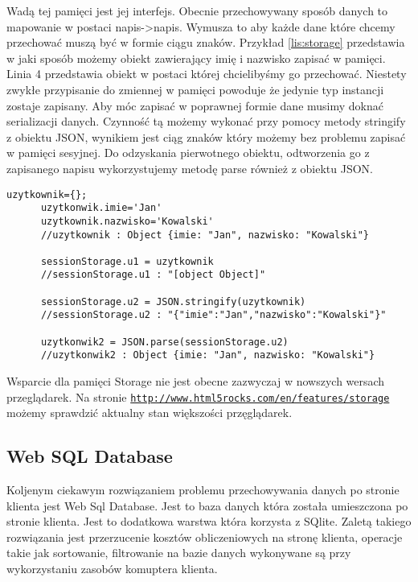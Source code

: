 Wadą tej pamięci jest jej interfejs. Obecnie przechowywany sposób danych to mapowanie w postaci napis->napis. Wymusza to aby każde dane które chcemy przechować muszą być w formie ciągu znaków. Przykład \ref{lis:storage} przedstawia w jaki sposób możemy obiekt zawierający imię i nazwisko zapisać w pamięci. Linia 4 przedstawia obiekt w postaci której chcielibyśmy go przechować. Niestety zwykłe przypisanie do zmiennej w pamięci powoduje że jedynie typ instancji zostaje zapisany. Aby móc zapisać w poprawnej formie dane musimy doknać serializacji danych. Czynność tą możemy wykonać przy pomocy metody stringify z obiektu JSON, wynikiem jest ciąg znaków który możemy bez problemu zapisać w pamięci sesyjnej. Do odzyskania pierwotnego obiektu, odtworzenia go z zapisanego napisu wykorzystujemy metodę parse również z obiektu JSON.

\lstset{language=JavaScript}
\label{lis:storage}
\begin{lstlisting}[caption=json]
      uzytkownik={};
      uzytkonwik.imie='Jan'
      uzytkownik.nazwisko='Kowalski'
      //uzytkownik : Object {imie: "Jan", nazwisko: "Kowalski"}

      sessionStorage.u1 = uzytkownik
      //sessionStorage.u1 : "[object Object]"

      sessionStorage.u2 = JSON.stringify(uzytkownik)
      //sessionStorage.u2 : "{"imie":"Jan","nazwisko":"Kowalski"}"

      uzytkonwik2 = JSON.parse(sessionStorage.u2)
      //uzytkonwik2 : Object {imie: "Jan", nazwisko: "Kowalski"}
\end{lstlisting}



Wsparcie dla pamięci Storage nie jest obecne zazwyczaj w nowszych wersach przeglądarek. Na stronie \underline{\texttt{http://www.html5rocks.com/en/features/storage}} możemy sprawdzić aktualny stan większości przęglądarek.

\subsection{Web SQL Database}
\label{subsec:websql}

Koljenym ciekawym rozwiązaniem problemu przechowywania danych po stronie klienta jest Web Sql Database.
Jest to baza danych która została umieszczona po stronie klienta. Jest to dodatkowa warstwa która korzysta z SQlite.
Zaletą takiego rozwiązania jest przerzucenie kosztów obliczeniowych na stronę klienta, operacje takie jak sortowanie, filtrowanie na bazie danych wykonywane są przy wykorzystaniu zasobów komuptera klienta.

